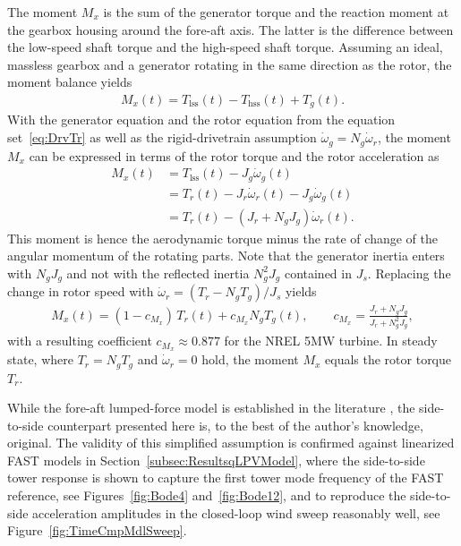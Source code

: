 The moment $M_x$ is the sum of the generator torque and the reaction moment at the gearbox housing around the fore-aft axis. The latter is the difference between the low-speed shaft torque and the high-speed shaft torque. Assuming an ideal, massless gearbox and a generator rotating in the same direction as the rotor, the moment balance yields
\begin{align*}
    M_x(t) = T_{\text{lss}}(t) - T_{\text{hss}}(t) + T_g(t).
\end{align*}
With the generator equation and the rotor equation from the equation set~\eqref{eq:DrvTr} as well as the rigid-drivetrain assumption $\dot{\omega}_g = N_g\dot{\omega}_r$, the moment $M_x$ can be expressed in terms of the rotor torque and the rotor acceleration as
\begin{align*}
    M_x(t) &= T_{\text{lss}}(t) - J_g\dot{\omega}_g(t)\\
    &= T_r(t) - J_r\dot{\omega}_r(t) - J_g\dot{\omega}_g(t)\\
    &= T_r(t) - \left(J_r + N_g J_g\right)\dot{\omega}_r(t).
\end{align*}
This moment is hence the aerodynamic torque minus the rate of change of the angular momentum of the rotating parts. Note that the generator inertia enters with $N_g J_g$ and not with the reflected inertia $N_g^2 J_g$ contained in $J_s$. Replacing the change in rotor speed with $\dot{\omega}_r = (T_r - N_g T_g)/J_s$ yields
\begin{align}\label{eq:Mx}
    M_x(t) = (1-c_{M_x})\,T_r(t) + c_{M_x}N_g T_g(t), \qquad c_{M_x} = \frac{J_r + N_g J_g}{J_r + N_g^2 J_g},
\end{align}
with a resulting coefficient         $c_{M_x} \approx 0.877$ for the NREL 5MW turbine. In steady state, where $T_r = N_gT_g$ and $\dot{\omega}_r = 0$ hold, the moment $M_x$ equals the rotor torque $T_r$.

While the fore-aft lumped-force model is established in the literature \cite{Bianchi2007}, the side-to-side counterpart presented here is, to the best of the author's knowledge, original. The validity of this simplified assumption is confirmed against linearized FAST models in Section~\ref{subsec:ResultsqLPVModel}, where the side-to-side tower response is shown to capture the first tower mode frequency of the FAST reference, see Figures~\ref{fig:Bode4} and~\ref{fig:Bode12}, and to reproduce the side-to-side acceleration amplitudes in the closed-loop wind sweep reasonably well, see Figure~\ref{fig:TimeCmpMdlSweep}.

